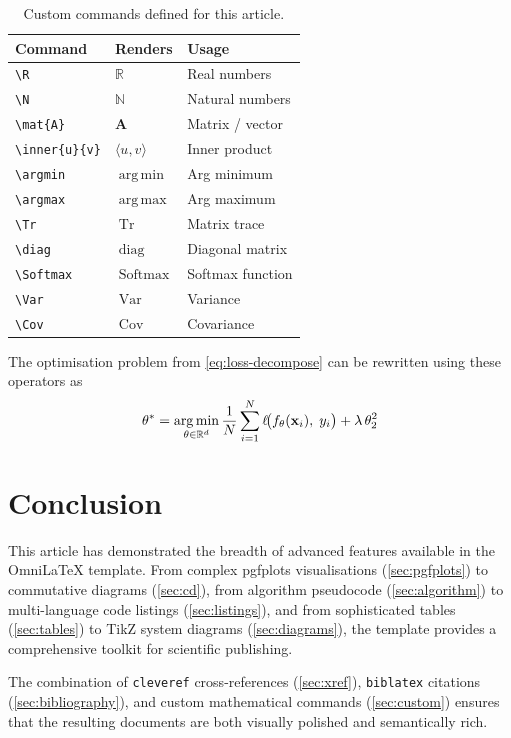 \documentclass[
    language=english,
    doctype=article,
    institution=none,
    titlestyle=book,
]{../../omnilatex}
\theoremstyle{definition}
\theoremstyle{definition}
\theoremstyle{remark}
\newcommand{\R}{\mathbb{R}}
\newcommand{\N}{\mathbb{N}}
\DeclareMathOperator*{\argmin}{arg\,min}
\DeclareMathOperator*{\argmax}{arg\,max}
\DeclareMathOperator{\Tr}{Tr}
\DeclareMathOperator{\diag}{diag}
\DeclareMathOperator{\Softmax}{Softmax}
\newcommand{\mat}[1]{\mathbf{#1}}
\DeclareMathOperator{\Var}{Var}
\DeclareMathOperator{\Cov}{Cov}
\newcommand{\inner}[2]{\langle #1, #2 \rangle}
\begin{document}
\begin{table}[htbp]
    \centering
    \caption{Custom commands defined for this article.}
    \label{tab:commands}
    \begin{tabular}{@{}lll@{}}
        \toprule
        \textbf{Command} & \textbf{Renders} & \textbf{Usage} \\
        \midrule
        \verb|\R|         & \(\R\)          & Real numbers \\
        \verb|\N|         & \(\N\)          & Natural numbers \\
        \verb|\mat{A}|    & \(\mat{A}\)     & Matrix / vector \\
        \verb|\inner{u}{v}| & \(\inner{u}{v}\) & Inner product \\
        \verb|\argmin|    & \(\argmin\)     & Arg minimum \\
        \verb|\argmax|    & \(\argmax\)     & Arg maximum \\
        \verb|\Tr|        & \(\Tr\)         & Matrix trace \\
        \verb|\diag|      & \(\diag\)       & Diagonal matrix \\
        \verb|\Softmax|   & \(\Softmax\)    & Softmax function \\
        \verb|\Var|       & \(\Var\)        & Variance \\
        \verb|\Cov|       & \(\Cov\)        & Covariance \\
        \bottomrule
    \end{tabular}
\end{table}

The optimisation problem from \cref{eq:loss-decompose} can be rewritten using
these operators as
\begin{equation}
    \label{eq:argmin}
    \mat{\theta}^* = \argmin_{\mat{\theta} \in \R^d}
        \frac{1}{N}\sum_{i=1}^{N}
        \ell\!\bigl(f_{\mat{\theta}}(\mat{x}_i),\; y_i\bigr)
        + \lambda\,\norm{\mat{\theta}}_2^2
\end{equation}


\section{Conclusion}
\label{sec:conclusion}

This article has demonstrated the breadth of advanced features available in the
OmniLaTeX template.  From complex pgfplots visualisations
(\cref{sec:pgfplots}) to commutative diagrams (\cref{sec:cd}), from algorithm
pseudocode (\cref{sec:algorithm}) to multi-language code listings
(\cref{sec:listings}), and from sophisticated tables (\cref{sec:tables}) to
TikZ system diagrams (\cref{sec:diagrams}), the template provides a
comprehensive toolkit for scientific publishing.

The combination of \texttt{cleveref} cross-references
(\cref{sec:xref}), \texttt{biblatex} citations (\cref{sec:bibliography}),
and custom mathematical commands (\cref{sec:custom}) ensures that the resulting
documents are both visually polished and semantically rich.


\printbibliography
\end{document}
